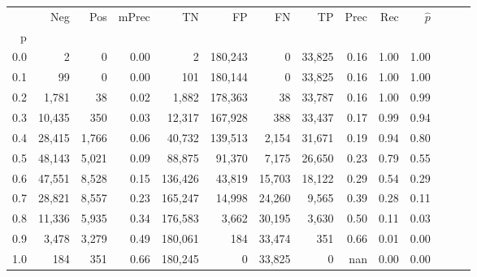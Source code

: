 \begin{tabular}{rrrrrrrrrrrrrr}
\toprule
{} &     Neg &    Pos & mPrec &       TN &       FP &      FN &      TP &  Prec &   Rec & $\hat{p}$ \\
p   &         &        &       &          &          &         &         &       &       &           \\
\midrule
0.0 &       2 &      0 &  0.00 &        2 &  180,243 &       0 &  33,825 &  0.16 &  1.00 &      1.00 \\
0.1 &      99 &      0 &  0.00 &      101 &  180,144 &       0 &  33,825 &  0.16 &  1.00 &      1.00 \\
0.2 &   1,781 &     38 &  0.02 &    1,882 &  178,363 &      38 &  33,787 &  0.16 &  1.00 &      0.99 \\
0.3 &  10,435 &    350 &  0.03 &   12,317 &  167,928 &     388 &  33,437 &  0.17 &  0.99 &      0.94 \\
0.4 &  28,415 &  1,766 &  0.06 &   40,732 &  139,513 &   2,154 &  31,671 &  0.19 &  0.94 &      0.80 \\
0.5 &  48,143 &  5,021 &  0.09 &   88,875 &   91,370 &   7,175 &  26,650 &  0.23 &  0.79 &      0.55 \\
0.6 &  47,551 &  8,528 &  0.15 &  136,426 &   43,819 &  15,703 &  18,122 &  0.29 &  0.54 &      0.29 \\
0.7 &  28,821 &  8,557 &  0.23 &  165,247 &   14,998 &  24,260 &   9,565 &  0.39 &  0.28 &      0.11 \\
0.8 &  11,336 &  5,935 &  0.34 &  176,583 &    3,662 &  30,195 &   3,630 &  0.50 &  0.11 &      0.03 \\
0.9 &   3,478 &  3,279 &  0.49 &  180,061 &      184 &  33,474 &     351 &  0.66 &  0.01 &      0.00 \\
1.0 &     184 &    351 &  0.66 &  180,245 &        0 &  33,825 &       0 &   nan &  0.00 &      0.00 \\
\bottomrule
\end{tabular}
